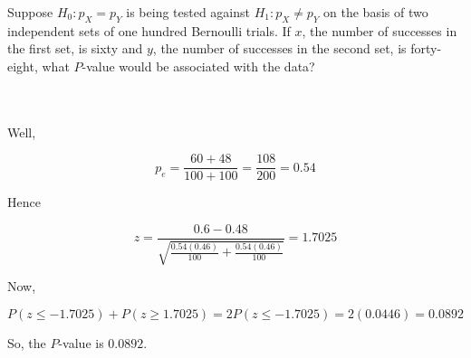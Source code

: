 Suppose $H_0:p_X=p_Y$ is being tested against $H_1:p_X \neq p_Y$ on the basis of two independent sets of
one hundred Bernoulli trials. If $x$, the number of successes in the first set, is sixty and $y$, the
number of successes in the second set, is forty-eight, what $P$-value would be associated with the
data?\\\\

\begin{solution}\renewcommand{\qedsymbol}{}\ \\
    Well,
    
    $$p_e=\frac{60+48}{100+100}=\frac{108}{200}=0.54$$
    
    Hence
    
    $$z=\frac{0.6-0.48}{\sqrt{\frac{0.54(0.46)}{100}+\frac{0.54(0.46)}{100}}}=1.7025$$
    
    Now,
    
    $$P(z\leq-1.7025)+P(z\geq1.7025)=2P(z\leq-1.7025)=2(0.0446)=0.0892$$
    
    So, the $P$-value is $0.0892$.

\end{solution}